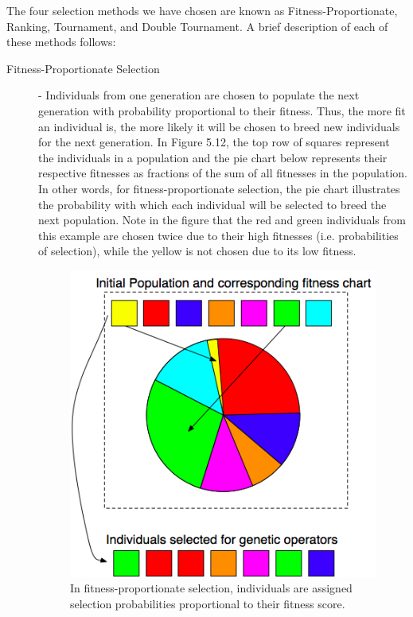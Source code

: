 \documentclass[a4paper,12pt]{report} 	%
\numberwithin{figure}{chapter}
\numberwithin{table}{chapter}
\numberwithin{equation}{chapter}
\begin{document}
\begin{flushleft}
The four selection methods we have chosen are known as Fitness-Proportionate, Ranking, Tournament, and Double Tournament. A brief description of each of these methods follows:
\begin{description}
\item [Fitness-Proportionate Selection] - Individuals from one generation are chosen to populate the next generation with probability proportional to their fitness. Thus, the more fit an individual is, the more likely it will be chosen to breed new individuals for the next generation. In Figure 5.12, the top row of squares represent the individuals in a population and the pie chart below represents their respective fitnesses as fractions of the sum of all fitnesses in the population. In other words, for fitness-proportionate selection, the pie chart illustrates the probability with which each individual will be selected to breed the next population. Note in the figure that the red and green individuals from this example are chosen twice due to their high fitnesses (i.e. probabilities of selection), while the yellow is not chosen due to its low fitness.
\begin{figure}[h!]
\begin{center}
\includegraphics[scale = 0.7]{PieChartSelection}
\caption[Fitness-proportionate Selection]{In fitness-proportionate selection, individuals are assigned selection probabilities proportional to their fitness score.}
\end{center}
\end{figure}

\end{description}
\end{flushleft}
\end{document}

